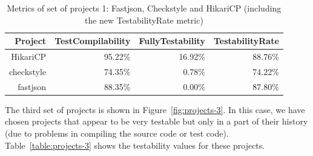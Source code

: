 \begin{table}[h!]
    \centering
    \begin{tabular}{|r|r|r|r|}
        \hline
        \textbf{Project} & \textbf{TestCompilability} & \textbf{FullyTestability} & \textbf{TestabilityRate} \\ \hline
        HikariCP         & 95.22\%                      & 16.92\%                      & 88.76\%                     \\ \hline
        checkstyle       & 74.35\%                      & 0.78\%                       & 74.22\%                     \\ \hline
        fastjson         & 88.35\%                      & 0.00\%                       & 87.80\%                     \\ \hline
        \end{tabular}
    \caption{Metrics of set of projects 1: Fastjson, Checkstyle and HikariCP (including the new TestabilityRate metric)}
    \label{table:projects-2-with-testability-rate}
\end{table}


The third set of projects is shown in Figure~\ref{fig:projects-3}. 
In this case, we have chosen projects that appear to be very testable but only in a part of their history (due to problems in compiling the source code or test code).
Table~\ref{table:projects-3} shows the testability values for these projects. 

